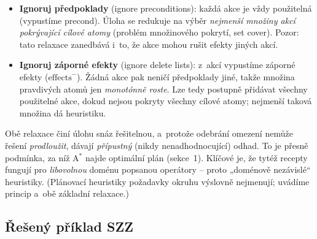 \begin{definice}
\begin{itemize}
  \item \textbf{Ignoruj předpoklady} (ignore preconditions): každá akce je vždy použitelná (vypustíme $\mathrm{precond}$). Úloha se redukuje na výběr \emph{nejmenší množiny akcí pokrývající cílové atomy} (problém množinového pokrytí, set cover). Pozor: tato relaxace zanedbává i~to, že akce mohou rušit efekty jiných akcí.
  \item \textbf{Ignoruj záporné efekty} (ignore delete lists): z~akcí vypustíme záporné efekty ($\mathrm{effects}^{-}$). Žádná akce pak neničí předpoklady jiné, takže množina pravdivých atomů jen \emph{monotónně roste}. Lze tedy postupně přidávat všechny použitelné akce, dokud nejsou pokryty všechny cílové atomy; nejmenší taková množina dá heuristiku.
\end{itemize}
\end{definice}

\begin{intuice}
Obě relaxace činí úlohu snáz řešitelnou, a~protože odebrání omezení nemůže řešení \emph{prodloužit}, dávají \emph{přípustný} (nikdy nenadhodnocující) odhad. To je přesně podmínka, za níž A${}^\ast$ najde optimální plán (sekce~1). Klíčové je, že tytéž recepty fungují pro \emph{libovolnou} doménu popsanou operátory -- proto „doménově nezávislé`` heuristiky. (Plánovací heuristiky požadavky okruhu výslovně nejmenují; uvádíme princip a~obě základní relaxace.)
\end{intuice}

\subsection{Řešený příklad SZZ}

